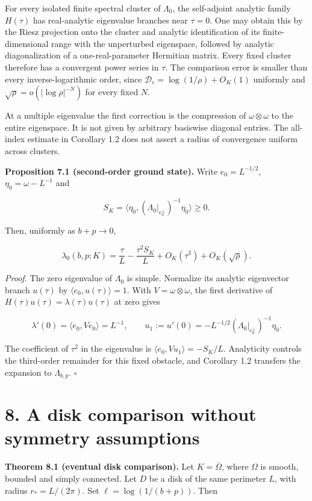 \documentclass[11pt]{article}
\begin{document}
For every isolated finite spectral cluster of \(\Lambda_0\), the
self-adjoint analytic family \(H(\tau)\) has real-analytic eigenvalue
branches near \(\tau=0\). One may obtain this by the Riesz projection
onto the cluster and analytic identification of its finite-dimensional
range with the unperturbed eigenspace, followed by analytic
diagonalization of a one-real-parameter Hermitian matrix. Every fixed
cluster therefore has a convergent power series in \(\tau\). The
comparison error is smaller than every inverse-logarithmic order, since
\(\mathcal D_c=\log(1/\rho)+O_K(1)\) uniformly and
\(\sqrt\rho=o(|\log\rho|^{-N})\) for every fixed \(N\).

At a multiple eigenvalue the first correction is the compression of
\(\omega\otimes\omega\) to the entire eigenspace. It is not given by
arbitrary basiswise diagonal entries. The all-index estimate in
Corollary 1.2 does not assert a radius of convergence uniform across
clusters.

\textbf{Proposition 7.1 (second-order ground state).} Write
\(e_0=L^{-1/2}\), \(\eta_0=\omega-L^{-1}\) and

\[S_K=\langle\eta_0,(\Lambda_0|_{e_0^\perp})^{-1}\eta_0\rangle\geq0.\]

Then, uniformly as \(b+p\to0\),

\[\lambda_0(b,p;K)=\frac{\tau}{L}-\frac{\tau^2 S_K}{L}+O_K(\tau^3)+O_K(\sqrt\rho).\tag{15}\]

\emph{Proof.} The zero eigenvalue of \(\Lambda_0\) is simple. Normalize
its analytic eigenvector branch \(u(\tau)\) by
\(\langle e_0,u(\tau)\rangle=1\). With \(V=\omega\otimes\omega\), the
first derivative of \(H(\tau)u(\tau)=\lambda(\tau)u(\tau)\) at zero
gives

\[\lambda'(0)=\langle e_0,Ve_0\rangle=L^{-1},\qquad
u_1:=u'(0)=-L^{-1/2}(\Lambda_0|_{e_0^\perp})^{-1}\eta_0.\]

The coefficient of \(\tau^2\) in the eigenvalue is
\(\langle e_0,Vu_1\rangle=-S_K/L\). Analyticity controls the third-order
remainder for this fixed obstacle, and Corollary 1.2 transfers the
expansion to \(\Lambda_{b,p}\). \(\square\)

\section{8. A disk comparison without symmetry
assumptions}\label{a-disk-comparison-without-symmetry-assumptions}

\textbf{Theorem 8.1 (eventual disk comparison).} Let
\(K=\overline\Omega\), where \(\Omega\) is smooth, bounded and simply
connected. Let \(D\) be a disk of the same perimeter \(L\), with radius
\(r_*=L/(2\pi)\). Set \(\ell=\log(1/(b+p))\). Then
\end{document}
